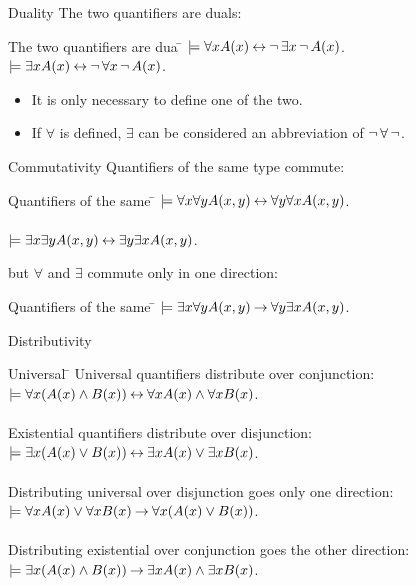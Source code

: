 \documentclass[style=sailor,size=12pt,mode=present]{powerdot}
\theoremstyle{definition}
\begin{document}
\begin{wideslide}[bm=,toc=]{Duality}
The two quantifiers are duals:
\begin{tabbing}
The two quantifiers are dua \= \kill
\> $\models \forall x A(x) \mathbin{\leftrightarrow} \mathop{\neg} \exists x \mathop{\neg} A(x)$.\\
\> $\models \exists x A(x) \mathbin{\leftrightarrow} \mathop{\neg} \forall x \mathop{\neg} A(x)$.
\end{tabbing}
\begin{itemize}
\item It is only necessary to define one of the two.
\item If $\forall$ is defined, $\exists$ can be considered an abbreviation of
      $\mathop{\neg} \forall \mathop{\neg}$.
\end{itemize}

\end{wideslide}

\begin{wideslide}[bm=,toc=]{Commutativity}
Quantifiers of the same type commute:
\begin{tabbing}
Quantifiers of the same \= \kill
\> $\models \forall x \forall y A(x,y) \mathbin{\leftrightarrow} \forall y \forall x A(x,y)$.\\
\> ~\\ 
\> $\models \exists x \exists y A(x,y) \mathbin{\leftrightarrow} \exists y \exists x A(x,y)$.\\
\end{tabbing}

but $\forall$ and $\exists$ commute only in one direction:
\begin{tabbing}
Quantifiers of the same \= \kill
\> $\models \exists x \forall y A(x,y) \mathbin{\rightarrow} \forall y \exists x A(x,y)$.\\
\end{tabbing}

\end{wideslide}

\begin{wideslide}[bm=,toc=]{Distributivity}
\begin{tabbing}
Universal \= \kill
Universal quantifiers distribute over conjunction:  \> \\
\>$\models \forall x(A(x) \land B(x)) \mathbin{\leftrightarrow} \forall x A(x) \land \forall x B(x)$.\\
~\\
Existential quantifiers distribute over disjunction:\\
\>$\models \exists x(A(x) \lor B(x)) \mathbin{\leftrightarrow} \exists x A(x) \lor \exists x B(x)$.\\
~\\
Distributing universal over disjunction goes only one direction:\\
\>$\models \forall x A(x) \lor \forall x B(x) \mathbin{\rightarrow} \forall x(A(x) \lor B(x))$.\\
~\\
Distributing existential over conjunction goes the other direction:\\
\>$\models \exists x(A(x) \land B(x)) \mathbin{\rightarrow} \exists x A(x) \land \exists x B(x)$.\\
\end{tabbing}

\end{wideslide}
\end{document}

